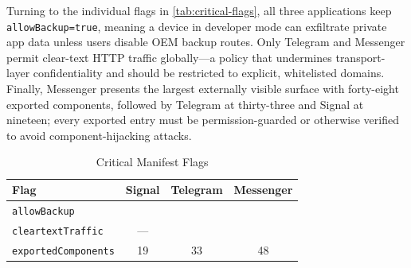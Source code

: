 \documentclass[a4paper,12pt]{report}
\newcommand{\cmark}{\ding{51}} %
\begin{document}
Turning to the individual flags in \autoref{tab:critical-flags}, all three applications keep \\
 \texttt{allowBackup=true}, meaning a device in developer mode can exfiltrate private app data unless users disable OEM backup routes. Only Telegram and Messenger permit clear-text HTTP traffic globally—a policy that undermines transport-layer confidentiality and should be restricted to explicit, whitelisted domains. Finally, Messenger presents the largest externally visible surface with forty-eight exported components, followed by Telegram at thirty-three and Signal at nineteen; every exported entry must be permission-guarded or otherwise verified to avoid component-hijacking attacks.
\begin{table}[htbp]
  \centering
  \caption{Critical Manifest Flags}
  \label{tab:critical-flags}
  \begin{tabular}{|l|c|c|c|}
    \hline
    \textbf{Flag} & \textbf{Signal} & \textbf{Telegram} & \textbf{Messenger} \\ \hline
    \texttt{allowBackup}        & \cmark & \cmark & \cmark \\ \hline
    \texttt{cleartextTraffic}   & —      & \cmark & \cmark \\ \hline
    \texttt{exportedComponents} & 19     & 33     & 48     \\ \hline
  \end{tabular}
\end{table}
\end{document}
